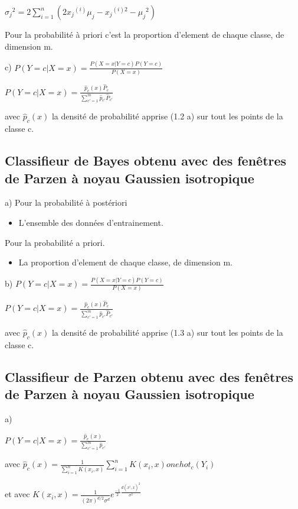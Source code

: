 \documentclass[a4paper,10pt]{article}
\begin{document}
$ {\sigma_j}^2 = 2 \sum_{i = 1}^{n}(2 {x_j}^{(i)}  \mu_j - {x_j}^{(i)2} - {\mu_j}^2)$

Pour la probabilité à priori c'est la proportion d'element de chaque classe, de dimension m.

c)
$P(Y=c | X=x)  = \frac{P(X=x | Y=c) P(Y=c)}{P(X=x)} $

$P(Y=c | X=x)  = \frac{ \hat{p}_{c}(x) \hat{P}_{c}}{ \sum_{c'=1}^{m} \hat{p}_{c'} \hat{P}_{c'} } $

avec $ \hat{p}_{c}(x) $ la densité de probabilité apprise (1.2 a) sur tout les points de la classe c.

\subsection{Classifieur de Bayes obtenu avec des fenêtres de Parzen à noyau Gaussien isotropique}

a) Pour la probabilité à postériori
\begin{itemize}
	\item L'ensemble des données d'entrainement.
\end{itemize}

Pour la probabilité a priori.
\begin{itemize}
	\item La proportion d'element de chaque classe, de dimension m.
\end{itemize}

b) $P(Y=c | X=x)  = \frac{P(X=x | Y=c) P(Y=c)}{P(X=x)} $

$P(Y=c | X=x)  = \frac{ \hat{p}_{c}(x) \hat{P}_{c}}{ \sum_{c'=1}^{m} \hat{p}_{c'} \hat{P}_{c'} } $

avec $ \hat{p}_{c}(x) $ la densité de probabilité apprise (1.3 a) sur tout les points de la classe c.


\subsection{Classifieur de Parzen obtenu avec des fenêtres de Parzen à noyau Gaussien isotropique}

a)

$P(Y=c | X=x)  = \frac{ \hat{p}_{c}(x) }{ \sum_{c'=1}^{m} \hat{p}_{c'} } $

avec $ \hat{p}_{c}(x) =  \frac{1}{ \sum_{i=1}^{n} K(x_{i}, x) } \sum_{i=1}^{n} K(x_{i}, x) onehot_{c}(Y_{i}) $

et avec $ K(x_{i}, x) = \frac{1}{ (2 \pi)^{d/2} \sigma^{d}}  e^{ \frac{-1}{2} \frac{d(x^{i},x)^{2}}{\sigma^{2}}} $ 
\end{document}
